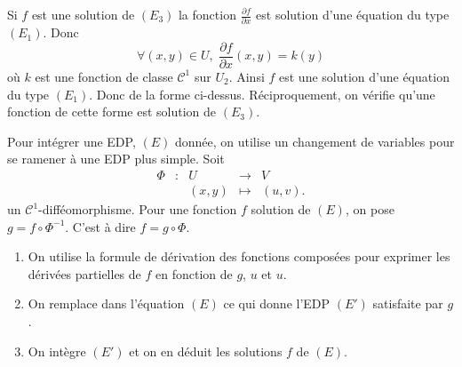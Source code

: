 \documentclass[11pt, class=report,crop=false]{standalone}
\begin{document}
\vskip4mm

Si $f$ est une solution de $(E_3)$ la fonction $\displaystyle \frac{\partial f}{\partial x}$ est solution d'une équation du type $(E_1)$. Donc
$$\forall (x,y)\in U,\; \frac{\partial f}{\partial x}(x,y)=k(y)$$
o\`u $k$ est une fonction de classe $\mathscr{C}^1$ sur $U_2$. Ainsi $f$ est une solution d'une équation du type $(E_1)$. Donc de la forme ci-dessus. Réciproquement, on vérifie qu'une fonction de cette forme est solution de $(E_3)$.

\vskip6mm

Pour intégrer une EDP, $(E)$ donnée, on utilise un changement de variables pour se ramener à une EDP plus simple. Soit
$$\begin{array}{ccccl}\Phi &:&U&\to&V\\&&(x,y)&\mapsto &\displaystyle (u,v).\end{array}$$
un $\mathscr{C}^1$-difféomorphisme. Pour une fonction $f$ solution de $(E)$, on pose $g=f\circ \Phi ^{-1}$. C'est à dire $f=g\circ \Phi$.
\begin{enumerate}
\item On utilise la formule de dérivation des fonctions composées pour exprimer les dérivées partielles de $f$ en fonction de $g$, $u$ et $u$.
\item On remplace dans l'équation $(E)$ ce qui donne l'EDP $(E')$ satisfaite par $g$.
\item On intègre $(E')$ et on en déduit les solutions $f$ de $(E)$.
\end{enumerate}

\vskip6mm
\end{document}

